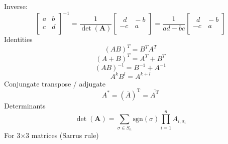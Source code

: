 \documentclass{article}
\begin{document}
	Inverse: 
	\begin{equation}
		\begin{bmatrix}
			a & b \\ c & d \\ 
		\end{bmatrix}^{-1} =
		\frac{1}{\det(\mathbf{A})} 
		\begin{bmatrix}
			\,\,\,d & \!\!-b \\ -c & \,a \\ 
		\end{bmatrix} =
		\frac{1}{ad - bc} 
		\begin{bmatrix}
			\,\,\,d & \!\!-b \\ -c & \,a \\ 
		\end{bmatrix}
	\end{equation}
	Identities
	\begin{equation}
		(AB)^T = B^TA^T
	\end{equation}
	\begin{equation}
		(A+B)^T = A^T+B^T
	\end{equation}
	\begin{equation}
		(AB)^{-1} = B^{-1}+A^{-1}
	\end{equation}
	\begin{equation}
		A^kB^l = A^{k+l}
	\end{equation}
	Conjungate transpose / adjugate 
	\begin{equation}
		A^* = (\overline{A})^\mathrm{T} = \overline{A^\mathrm{T}}
	\end{equation}
	Determinants
		\begin{equation}
			\det(\mathbf{A}) = \sum_{\sigma \in S_n} \mbox{sgn}(\sigma) \prod_{i=1}^n A_{i,\sigma_i}
		\end{equation}
		For 3$\times$3 matrices (Sarrus rule)
\end{document}
